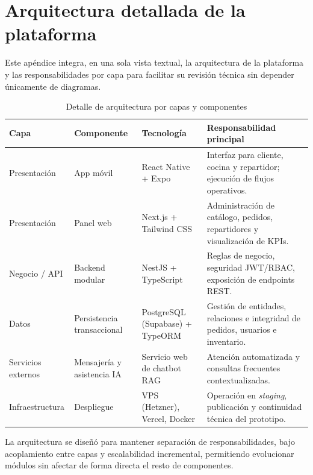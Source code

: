 \section*{Arquitectura detallada de la plataforma}
Este apéndice integra, en una sola vista textual, la arquitectura de la plataforma y las responsabilidades por capa para facilitar su revisión técnica sin depender únicamente de diagramas.

\begin{table}[htbp]
\centering
\caption{Detalle de arquitectura por capas y componentes}
\label{tab:apendice-arquitectura-detalle}
\small
\begin{tabular}{|>{\raggedright\arraybackslash}p{2.5cm}|>{\raggedright\arraybackslash}p{2.3cm}|>{\raggedright\arraybackslash}p{2.5cm}|>{\raggedright\arraybackslash}p{4.3cm}|}
\hline
\textbf{Capa} & \textbf{Componente} & \textbf{Tecnología} & \textbf{Responsabilidad principal} \\
\hline
Presentación & App móvil & React Native + Expo & Interfaz para cliente, cocina y repartidor; ejecución de flujos operativos. \\
\hline
Presentación & Panel web & Next.js + Tailwind CSS & Administración de catálogo, pedidos, repartidores y visualización de KPIs. \\
\hline
Negocio / API & Backend modular & NestJS + TypeScript & Reglas de negocio, seguridad JWT/RBAC, exposición de endpoints REST. \\
\hline
Datos & Persistencia transaccional & PostgreSQL (Supabase) + TypeORM & Gestión de entidades, relaciones e integridad de pedidos, usuarios e inventario. \\
\hline
Servicios externos & Mensajería y asistencia IA & Servicio web de chatbot RAG & Atención automatizada y consultas frecuentes contextualizadas. \\
\hline
Infraestructura & Despliegue & VPS (Hetzner), Vercel, Docker & Operación en \textit{staging}, publicación y continuidad técnica del prototipo. \\
\hline
\end{tabular}
\end{table}

La arquitectura se diseñó para mantener separación de responsabilidades, bajo acoplamiento entre capas y escalabilidad incremental, permitiendo evolucionar módulos sin afectar de forma directa el resto de componentes.

